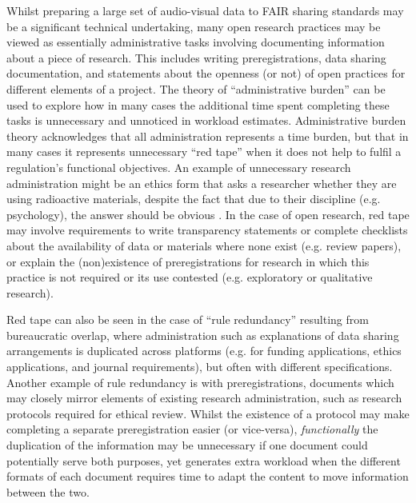 \documentclass[meta, authordate]{jote-new-article}
\begin{document}
Whilst preparing a large set of audio-visual data to FAIR sharing standards may be a significant technical undertaking, many open research practices may be viewed as essentially administrative tasks involving documenting information about a piece of research. This includes writing preregistrations, data sharing documentation, and statements about the openness (or not) of open practices for different elements of a project. The theory of “administrative burden” \parencites{Bozeman1993} can be used to explore how in many cases the additional time spent completing these tasks is unnecessary and unnoticed in workload estimates. Administrative burden theory acknowledges that all administration represents a time burden, but that in many cases it represents unnecessary “red tape” when it does not help to fulfil a regulation’s functional objectives. An example of unnecessary research administration might be an ethics form that asks a researcher whether they are using radioactive materials, despite the fact that due to their discipline (e.g. psychology), the answer should be obvious \parencites{Bozeman2020}. In the case of open research, red tape may involve requirements to write transparency statements or complete checklists about the availability of data or materials where none exist (e.g. review papers), or explain the (non)existence of preregistrations for research in which this practice is not required or its use contested (e.g. exploratory or qualitative research).



Red tape can also be seen in the case of “rule redundancy” \parencites{Bozeman2017} resulting from bureaucratic overlap, where administration such as explanations of data sharing arrangements is duplicated across platforms (e.g. for funding applications, ethics applications, and journal requirements), but often with different specifications. Another example of rule redundancy is with preregistrations, documents which may closely mirror elements of existing research administration, such as research protocols required for ethical review. Whilst the existence of a protocol may make completing a separate preregistration easier (or vice-versa), \emph{functionally} the duplication of the information may be unnecessary if one document could potentially serve both purposes, yet generates extra workload when the different formats of each document requires time to adapt the content to move information between the two.
\end{document}
